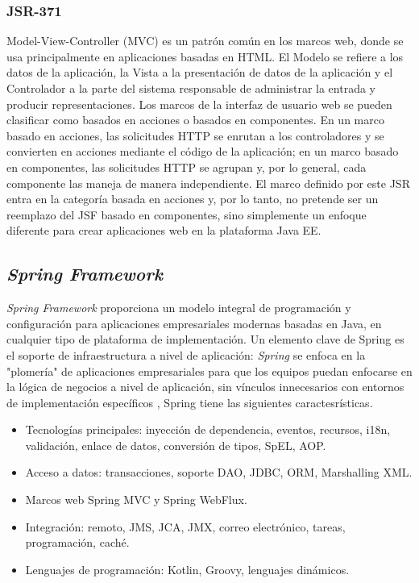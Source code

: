 \begin{spacing}{1.5}
		\subsubsection{JSR-371}
			Model-View-Controller (MVC) es un patrón común en los marcos web, donde se usa principalmente en aplicaciones basadas en HTML. El Modelo se refiere a los datos de la aplicación, la Vista a la presentación de datos de la aplicación y el Controlador a la parte del sistema responsable de administrar la entrada y producir representaciones. Los marcos de la interfaz de usuario web se pueden clasificar como basados en acciones o basados en componentes. En un marco basado en acciones, las solicitudes HTTP se enrutan a los controladores y se convierten en acciones mediante el código de la aplicación; en un marco basado en componentes, las solicitudes HTTP se agrupan y, por lo general, cada componente las maneja de manera independiente. El marco definido por este JSR entra en la categoría basada en acciones y, por lo tanto, no pretende ser un reemplazo del JSF basado en componentes, sino simplemente un enfoque diferente para crear aplicaciones web en la plataforma Java EE.
	\subsection{\textit{Spring Framework}}
			\textit{Spring Framework} proporciona un modelo integral de programación y configuración para aplicaciones empresariales modernas basadas en Java, en cualquier tipo de plataforma de implementación.
			Un elemento clave de Spring es el soporte de infraestructura a nivel de aplicación: \textit{Spring} se enfoca en la "plomería" de aplicaciones empresariales para que los equipos puedan enfocarse en la lógica de negocios a nivel de aplicación, sin vínculos innecesarios con entornos de implementación específicos \cite{chap2_spring}, Spring tiene las siguientes caractesr\'{i}sticas.
			
			\begin{itemize}
				\item Tecnologías principales: inyección de dependencia, eventos, recursos, i18n, validación, enlace de datos, conversión de tipos, SpEL, AOP.
				\item Acceso a datos: transacciones, soporte DAO, JDBC, ORM, Marshalling XML.
				\item Marcos web Spring MVC y Spring WebFlux.
				\item Integración: remoto, JMS, JCA, JMX, correo electrónico, tareas, programación, caché.
				\item Lenguajes de programaci\'{o}n: Kotlin, Groovy, lenguajes dinámicos.
			\end{itemize}

\end{spacing}
